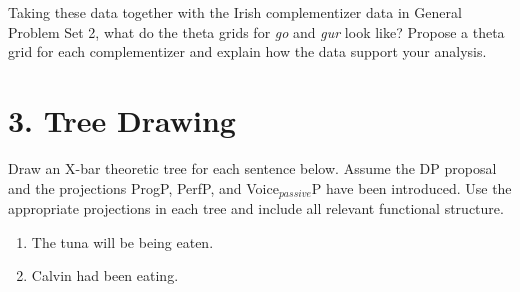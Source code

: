 ﻿\documentclass[11pt]{article}
\begin{document}
Taking these data together with the Irish complementizer data in General Problem Set 2, what do the theta grids for \textit{go} and \textit{gur} look like? Propose a theta grid for each complementizer and explain how the data support your analysis.

\newpage
\section*{3. Tree Drawing}

Draw an X-bar theoretic tree for each sentence below. Assume the DP proposal and the projections ProgP, PerfP, and Voice$_{passive}$P have been introduced. Use the appropriate projections in each tree and include all relevant functional structure.

\vspace{2em}
\begin{enumerate}
  \item The tuna will be being eaten.

  \vspace{8cm}

  \item Calvin had been eating.

  \vspace{8cm}
\end{enumerate}
\end{document}

